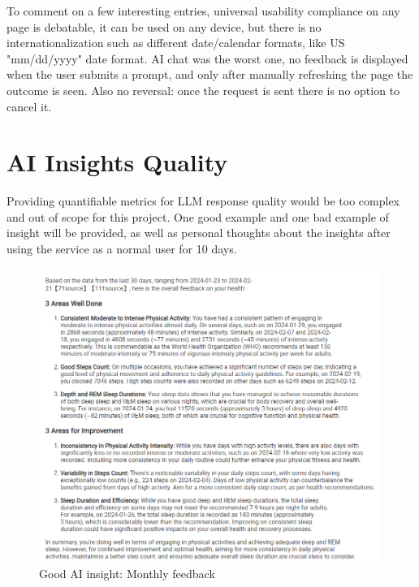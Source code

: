 To comment on a few interesting entries, universal usability compliance on any page is debatable, it can be used on any device, but there is no internationalization such as different date/calendar formats, like US "mm/dd/yyyy" date format. AI chat was the worst one, no feedback is displayed when the user submits a prompt, and only after manually refreshing the page the outcome is seen. Also no reversal: once the request is sent there is no option to cancel it.
\section{AI Insights Quality}
Providing quantifiable metrics for LLM response quality would be too complex and out of scope for this project. One good example and one bad example of insight will be provided, as well as personal thoughts about the insights after using the service as a normal user for 10 days. 
\begin{figure}
    
    \centering
    \includegraphics[width=1\textwidth,keepaspectratio]{../images/GoodAi.png}
    \caption{Good AI insight: Monthly feedback}
    \label{fig:goodAi}
    
\end{figure}
